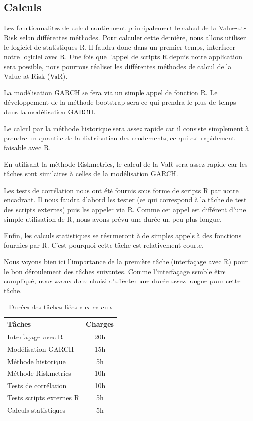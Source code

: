 \documentclass[a4paper]{report}
\begin{document}
\subsection{Calculs}
Les fonctionnalités de calcul contiennent principalement le calcul de la Value-at-Risk selon différentes méthodes. Pour calculer cette dernière, nous allons utiliser le logiciel de statistiques R. Il faudra donc dans un premier temps, interfacer notre logiciel avec R. Une fois que l'appel de scripts R depuis notre application sera possible, nous pourrons réaliser les différentes méthodes de calcul de la Value-at-Risk (VaR).

La modélisation GARCH se fera via un simple appel de fonction R. Le développement de la méthode bootstrap sera ce qui prendra le plus de temps dans la modélisation GARCH.

Le calcul par la méthode historique sera assez rapide car il consiste simplement à prendre un quantile de la distribution des rendements, ce qui est rapidement faisable avec R.

En utilisant la méthode Riskmetrics, le calcul de la VaR sera assez rapide car les tâches sont similaires à celles de la modélisation GARCH.

Les tests de corrélation nous ont été fournis sous forme de scripts R par notre encadrant. Il nous faudra d'abord les tester (ce qui correspond à la tâche de test des scripts externes) puis les appeler via R. Comme cet appel est différent d'une simple utilisation de R, nous avons prévu une durée un peu plus longue.

Enfin, les calculs statistiques se résumeront à de simples appels à des fonctions fournies par R. C'est pourquoi cette tâche est relativement courte. 

Nous voyons bien ici l'importance de la première tâche (interfaçage avec R) pour le bon déroulement des tâches suivantes. Comme l'interfaçage semble être compliqué, nous avons donc choisi d'affecter une durée assez longue pour cette tâche.

\begin{table}[H]
\centering
  \begin{tabularx}{0.8\textwidth}{| X | c |}
    \hline
	Tâches & Charges \\
    \hline
    Interfaçage avec R &  20h \\
    Modélisation GARCH &  15h \\
    Méthode historique &  5h \\
    Méthode Riskmetrics &  10h \\
    Tests de corrélation &  10h \\
    Tests scripts externes R & 5h \\
    Calculs statistiques &  5h \\
    \hline
  \end{tabularx}
  \caption{Durées des tâches liées aux calculs}
\end{table}
\end{document}
